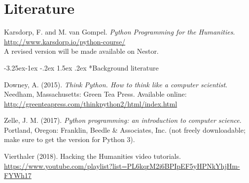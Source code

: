 \documentclass[a4paper,12pt]{article}
\makeatletter
\renewcommand\subsection{\@startsection{subsection}{2}{\z@}%
		{-3.25ex\@plus -1ex \@minus -.2ex}%
		{1.5ex \@plus .2ex}%
		{\normalfont\scshape}}
\makeatother
\begin{document}
\section{Literature}
Karsdorp, F. and M. van Gompel. \emph{Python Programming for the Humanities}.
\url{http://www.karsdorp.io/python-course/} \\
A revised version will be made available on Nestor.


\subsection*{Background literature}

Downey, A. (2015). \emph{Think Python. How to think like a computer scientist}.
Needham, Massachusetts: Green Tea Press.
Available online: \url{http://greenteapress.com/thinkpython2/html/index.html}

Zelle, J. M. (2017).
\emph{Python programming: an introduction to computer science}.
Portland, Oregon: Franklin, Beedle \& Associates, Inc.
(not freely downloadable; make sure to get the version for Python 3).

Vierthaler (2018). Hacking the Humanities video tutorials.
\url{https://www.youtube.com/playlist?list=PL6kqrM2i6BPIpEF5yHPNkYhjHm-FYWh17}


\pagebreak
\end{document}
